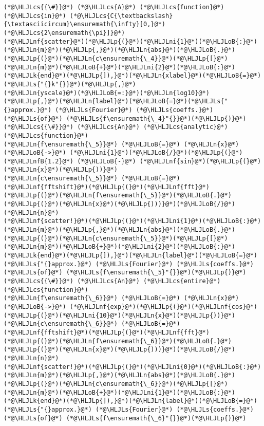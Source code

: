 \documentclass[12pt,a4paper]{article}
\newcommand{\HLJLk}[1]{\textcolor[RGB]{148,91,176}{\textbf{#1}}}
\newcommand{\HLJLn}[1]{#1}
\newcommand{\HLJLnf}[1]{\textcolor[RGB]{66,102,213}{#1}}
\newcommand{\HLJLs}[1]{\textcolor[RGB]{201,61,57}{#1}}
\newcommand{\HLJLnfB}[1]{\textcolor[RGB]{59,151,46}{#1}}
\newcommand{\HLJLni}[1]{\textcolor[RGB]{59,151,46}{#1}}
\newcommand{\HLJLoB}[1]{\textcolor[RGB]{102,102,102}{\textbf{#1}}}
\newcommand{\HLJLp}[1]{#1}
\newcommand{\HLJLcs}[1]{\textcolor[RGB]{153,153,119}{\textit{#1}}}
\begin{document}
\begin{lstlisting}
(*@\HLJLcs{{\#}}@*) (*@\HLJLcs{A}@*) (*@\HLJLcs{function}@*) (*@\HLJLcs{in}@*) (*@\HLJLcs{C{\textbackslash}{\textasciicircum}\ensuremath{\infty}[0,}@*) (*@\HLJLcs{2\ensuremath{\pi}]}@*)
(*@\HLJLnf{scatter}@*)(*@\HLJLp{(}@*)(*@\HLJLni{1}@*)(*@\HLJLoB{:}@*)(*@\HLJLn{m}@*)(*@\HLJLp{,}@*)(*@\HLJLn{abs}@*)(*@\HLJLoB{.}@*)(*@\HLJLp{(}@*)(*@\HLJLn{c\ensuremath{\_4}}@*)(*@\HLJLp{[}@*)(*@\HLJLn{m}@*)(*@\HLJLoB{+}@*)(*@\HLJLni{2}@*)(*@\HLJLoB{:}@*)(*@\HLJLk{end}@*)(*@\HLJLp{]),}@*)(*@\HLJLn{xlabel}@*)(*@\HLJLoB{=}@*)(*@\HLJLs{"{}k"{}}@*)(*@\HLJLp{,}@*)
(*@\HLJLn{yscale}@*)(*@\HLJLoB{=:}@*)(*@\HLJLn{log10}@*)(*@\HLJLp{,}@*)(*@\HLJLn{label}@*)(*@\HLJLoB{=}@*)(*@\HLJLs{"{}approx.}@*) (*@\HLJLs{Fourier}@*) (*@\HLJLs{coeffs.}@*) (*@\HLJLs{of}@*) (*@\HLJLs{f\ensuremath{\_4}"{}}@*)(*@\HLJLp{)}@*)
(*@\HLJLcs{{\#}}@*) (*@\HLJLcs{An}@*) (*@\HLJLcs{analytic}@*) (*@\HLJLcs{function}@*)
(*@\HLJLn{f\ensuremath{\_5}}@*) (*@\HLJLoB{=}@*) (*@\HLJLn{x}@*) (*@\HLJLoB{->}@*) (*@\HLJLni{1}@*)(*@\HLJLoB{/}@*)(*@\HLJLp{(}@*)(*@\HLJLnfB{1.2}@*) (*@\HLJLoB{-}@*) (*@\HLJLnf{sin}@*)(*@\HLJLp{(}@*)(*@\HLJLn{x}@*)(*@\HLJLp{))}@*)
(*@\HLJLn{c\ensuremath{\_5}}@*) (*@\HLJLoB{=}@*) (*@\HLJLnf{fftshift}@*)(*@\HLJLp{(}@*)(*@\HLJLnf{fft}@*)(*@\HLJLp{(}@*)(*@\HLJLn{f\ensuremath{\_5}}@*)(*@\HLJLoB{.}@*)(*@\HLJLp{(}@*)(*@\HLJLn{x}@*)(*@\HLJLp{)))}@*)(*@\HLJLoB{/}@*)(*@\HLJLn{n}@*)
(*@\HLJLnf{scatter!}@*)(*@\HLJLp{(}@*)(*@\HLJLni{1}@*)(*@\HLJLoB{:}@*)(*@\HLJLn{m}@*)(*@\HLJLp{,}@*)(*@\HLJLn{abs}@*)(*@\HLJLoB{.}@*)(*@\HLJLp{(}@*)(*@\HLJLn{c\ensuremath{\_5}}@*)(*@\HLJLp{[}@*)(*@\HLJLn{m}@*)(*@\HLJLoB{+}@*)(*@\HLJLni{2}@*)(*@\HLJLoB{:}@*)(*@\HLJLk{end}@*)(*@\HLJLp{]),}@*)(*@\HLJLn{label}@*)(*@\HLJLoB{=}@*)(*@\HLJLs{"{}approx.}@*) (*@\HLJLs{Fourier}@*) (*@\HLJLs{coeffs.}@*) (*@\HLJLs{of}@*) (*@\HLJLs{f\ensuremath{\_5}"{}}@*)(*@\HLJLp{)}@*)
(*@\HLJLcs{{\#}}@*) (*@\HLJLcs{An}@*) (*@\HLJLcs{entire}@*) (*@\HLJLcs{function}@*)
(*@\HLJLn{f\ensuremath{\_6}}@*) (*@\HLJLoB{=}@*) (*@\HLJLn{x}@*) (*@\HLJLoB{->}@*) (*@\HLJLnf{exp}@*)(*@\HLJLp{(}@*)(*@\HLJLnf{cos}@*)(*@\HLJLp{(}@*)(*@\HLJLni{10}@*)(*@\HLJLn{x}@*)(*@\HLJLp{))}@*)
(*@\HLJLn{c\ensuremath{\_6}}@*) (*@\HLJLoB{=}@*) (*@\HLJLnf{fftshift}@*)(*@\HLJLp{(}@*)(*@\HLJLnf{fft}@*)(*@\HLJLp{(}@*)(*@\HLJLn{f\ensuremath{\_6}}@*)(*@\HLJLoB{.}@*)(*@\HLJLp{(}@*)(*@\HLJLn{x}@*)(*@\HLJLp{)))}@*)(*@\HLJLoB{/}@*)(*@\HLJLn{n}@*)
(*@\HLJLnf{scatter!}@*)(*@\HLJLp{(}@*)(*@\HLJLni{0}@*)(*@\HLJLoB{:}@*)(*@\HLJLn{m}@*)(*@\HLJLp{,}@*)(*@\HLJLn{abs}@*)(*@\HLJLoB{.}@*)(*@\HLJLp{(}@*)(*@\HLJLn{c\ensuremath{\_6}}@*)(*@\HLJLp{[}@*)(*@\HLJLn{m}@*)(*@\HLJLoB{+}@*)(*@\HLJLni{1}@*)(*@\HLJLoB{:}@*)(*@\HLJLk{end}@*)(*@\HLJLp{]),}@*)(*@\HLJLn{label}@*)(*@\HLJLoB{=}@*)(*@\HLJLs{"{}approx.}@*) (*@\HLJLs{Fourier}@*) (*@\HLJLs{coeffs.}@*) (*@\HLJLs{of}@*) (*@\HLJLs{f\ensuremath{\_6}"{}}@*)(*@\HLJLp{)}@*)
\end{lstlisting}
\end{document}
